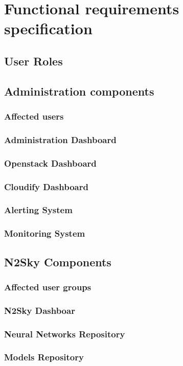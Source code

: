 \section{Functional requirements specification}\label{Functional requirements specification}

\subsection{User Roles}\label{User Roles}

\subsection{Administration components}\label{Administration components}
\subsubsection{Affected users}\label{Affected users}
\subsubsection{Administration Dashboard}\label{Administration Dashboard}
\subsubsection{Openstack Dashboard}\label{Openstack Dashboard}
\subsubsection{Cloudify Dashboard}\label{Cloudify Dashboard}
\subsubsection{Alerting System}\label{Alerting System}
\subsubsection{Monitoring System}\label{Monitoring System}

\subsection{N2Sky Components}\label{N2Sky Components}
\subsubsection{Affected user groups}\label{Affected user groups 2}
\subsubsection{N2Sky Dashboar}\label{N2Sky Dashboar}
\subsubsection{Neural Networks Repository}\label{Neural Networks Repository}
\subsubsection{Models Repository}\label{Models Repository}
